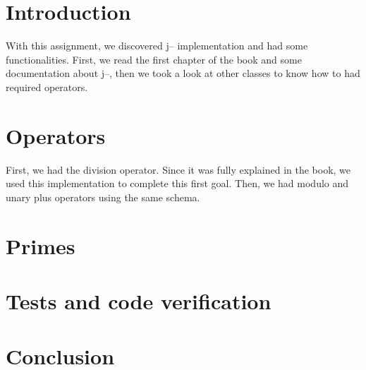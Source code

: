 




\section{Introduction}
With this assignment, we discovered j-- implementation and had some functionalities. First, we read the first chapter of the book and some documentation about j--, then we took a look at other classes to know how to had required operators. 
\section{Operators}
First, we had the division operator. Since it was fully explained in the book, we used this implementation to complete this first goal. Then, we had modulo and unary plus operators using the same schema.
\section{Primes}

\section{Tests and code verification}

\section{Conclusion}





